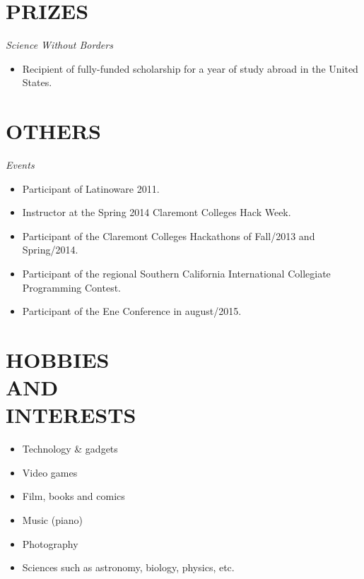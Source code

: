 \documentclass[margin]{res}
\begin{document}
\begin{resume}
		\section{PRIZES}
			{\sl Science Without Borders}
			\begin{itemize}
				\item[] Recipient of fully-funded scholarship for a year of study abroad in the United States.
			\end{itemize}

		\section{OTHERS}
			{\sl Events}
			\begin{itemize}
				\item[] Participant of Latinoware 2011.
				\item[] Instructor at the Spring 2014 Claremont Colleges Hack Week.
				\item[] Participant of the Claremont Colleges Hackathons of Fall/2013 and Spring/2014.
				\item[] Participant of the regional Southern California International Collegiate Programming Contest.
				\item[] Participant of the Ene Conference in august/2015.
			\end{itemize}

		\section{HOBBIES \\ AND \\ INTERESTS}
			\begin{itemize}
				\itemsep -2pt
		    	\item Technology \& gadgets
				\item Video games
				\item Film, books and comics
				\item Music (piano)
				\item Photography
				\item Sciences such as astronomy, biology, physics, etc.
			\end{itemize}
	\end{resume}
\end{document}
